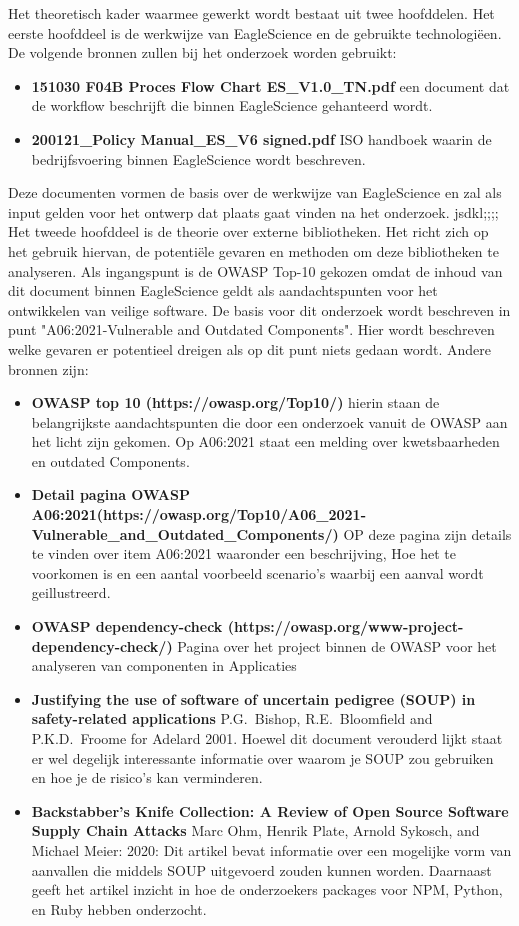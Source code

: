 Het theoretisch kader waarmee gewerkt wordt bestaat uit twee hoofddelen. Het eerste hoofddeel is de werkwijze van EagleScience en de gebruikte technologiëen. De volgende bronnen zullen bij het onderzoek worden gebruikt:
\begin{itemize}
    \item \textbf{151030 F04B Proces Flow Chart ES\_V1.0\_TN.pdf} een document dat de workflow beschrijft die binnen EagleScience gehanteerd wordt.
    \item \textbf{200121\_Policy Manual\_ES\_V6 signed.pdf} ISO handboek waarin de bedrijfsvoering binnen EagleScience wordt beschreven.
\end{itemize}
Deze documenten vormen de basis over de werkwijze van EagleScience en zal als input gelden voor het ontwerp dat plaats gaat vinden na het onderzoek.
jsdkl;;;;
Het tweede hoofddeel is de theorie over externe bibliotheken. Het richt zich op het gebruik hiervan, de potentiële gevaren en methoden om deze bibliotheken te analyseren. Als ingangspunt is de OWASP Top-10 gekozen omdat de inhoud van dit document binnen EagleScience geldt als aandachtspunten voor het ontwikkelen van veilige software. De basis voor dit onderzoek wordt beschreven in punt "A06:2021-Vulnerable and Outdated Components". Hier wordt beschreven welke gevaren er potentieel dreigen als op dit punt niets gedaan wordt. Andere bronnen zijn:
\begin{itemize}
    \item \textbf{OWASP top 10 (https://owasp.org/Top10/)} hierin staan de belangrijkste aandachtspunten die door een onderzoek vanuit de OWASP aan het licht zijn gekomen. Op A06:2021 staat een melding over kwetsbaarheden en outdated Components.
    \item \textbf{Detail pagina OWASP A06:2021(https://owasp.org/Top10/A06\_2021-Vulnerable\_and\_Outdated\_Components/)} OP deze pagina zijn details te vinden over item A06:2021 waaronder een beschrijving, Hoe het te voorkomen is en een aantal voorbeeld scenario's waarbij een aanval wordt geillustreerd.
    \item \textbf{OWASP dependency-check (https://owasp.org/www-project-dependency-check/)} Pagina over het project binnen de OWASP voor het analyseren van componenten in Applicaties
    \item \textbf{Justifying the use of software of uncertain pedigree (SOUP) in safety-related applications} P.G.\ Bishop, R.E.\ Bloomfield and P.K.D.\  Froome for Adelard 2001. Hoewel dit document verouderd lijkt staat er wel degelijk interessante informatie over waarom je SOUP zou gebruiken en hoe je de risico's kan verminderen.
    \item \textbf{Backstabber’s Knife Collection: A Review of Open Source Software Supply Chain Attacks} Marc Ohm, Henrik Plate, Arnold Sykosch, and Michael Meier: 2020: Dit artikel bevat informatie over een mogelijke vorm van aanvallen die middels SOUP uitgevoerd zouden kunnen worden. Daarnaast geeft het artikel inzicht in hoe de onderzoekers packages voor NPM, Python, en Ruby hebben onderzocht.
\end{itemize}
